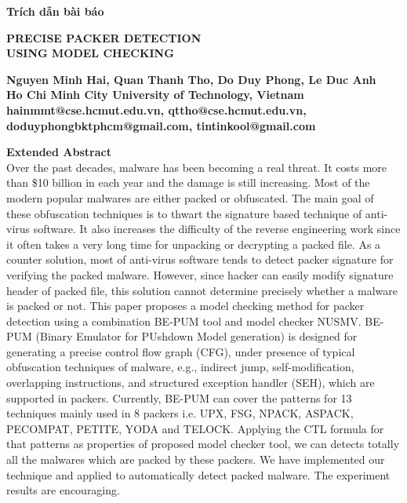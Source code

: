 \newpage
\begin{Large}
\textbf{Trích dẫn bài báo}
\end{Large}

\vspace{2cm}

\begin{Large}
\begin{center}
\textbf{PRECISE PACKER DETECTION\\ USING MODEL CHECKING}
\end{center}
\end{Large}

\vspace{1cm}

\begin{center}
\textbf
{
Nguyen Minh Hai, Quan Thanh Tho, Do Duy Phong, Le Duc Anh\\ 
Ho Chi Minh City University of Technology, Vietnam\\
hainmmt@cse.hcmut.edu.vn, qttho@cse.hcmut.edu.vn, doduyphongbktphcm@gmail.com, tintinkool@gmail.com
}
\end{center}

\vspace{1cm}

\textbf{Extended Abstract}\\
Over the past decades, malware has been becoming a real threat. It costs more than \$10 billion in each year and the damage is still increasing. Most of the modern popular malwares are either packed or obfuscated. The main goal of these obfuscation techniques is to thwart the signature based technique of anti-virus software. It also increases the difficulty of the reverse engineering work since it often takes a very long time for unpacking or decrypting a packed file. As a counter solution, most of anti-virus software tends to detect packer signature for verifying the packed malware. However, since hacker can easily modify signature header of packed file, this solution cannot determine precisely whether a malware is packed or not. This paper proposes a model checking method for packer detection using a combination BE-PUM tool and model checker NUSMV. BE-PUM (Binary Emulator for PUshdown Model generation) is designed for generating a precise control flow graph (CFG), under presence of typical obfuscation techniques of malware, e.g., indirect jump, self-modification, overlapping instructions, and structured exception handler (SEH), which are supported in packers. Currently, BE-PUM can cover the patterns for 13 techniques mainly used in 8 packers i.e. UPX, FSG, NPACK, ASPACK, PECOMPAT, PETITE, YODA and TELOCK. Applying the CTL formula for that patterns as properties of proposed model checker tool, we can detects totally all the malwares which are packed by these packers. We have implemented our technique and applied to automatically detect packed malware. The experiment results are encouraging.

